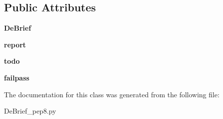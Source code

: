 \subsection*{Public Attributes}
\begin{DoxyCompactItemize}
\item 
\hypertarget{classc_1_1_de_brief__pep8_1_1_de_brief_ae38371809971d10fde576439e30e3ef4}{}{\bfseries De\+Brief}\label{classc_1_1_de_brief__pep8_1_1_de_brief_ae38371809971d10fde576439e30e3ef4}

\item 
\hypertarget{classc_1_1_de_brief__pep8_1_1_de_brief_ad9d99918a84aebe54fb39fcc92fa2e41}{}{\bfseries report}\label{classc_1_1_de_brief__pep8_1_1_de_brief_ad9d99918a84aebe54fb39fcc92fa2e41}

\item 
\hypertarget{classc_1_1_de_brief__pep8_1_1_de_brief_ad7071de4b48c99097f23158b2599ee2f}{}{\bfseries todo}\label{classc_1_1_de_brief__pep8_1_1_de_brief_ad7071de4b48c99097f23158b2599ee2f}

\item 
\hypertarget{classc_1_1_de_brief__pep8_1_1_de_brief_a291d3fbaa25f65180b7dded9cb750f8e}{}{\bfseries failpass}\label{classc_1_1_de_brief__pep8_1_1_de_brief_a291d3fbaa25f65180b7dded9cb750f8e}

\end{DoxyCompactItemize}


The documentation for this class was generated from the following file\+:\begin{DoxyCompactItemize}
\item 
De\+Brief\+\_\+pep8.\+py\end{DoxyCompactItemize}
